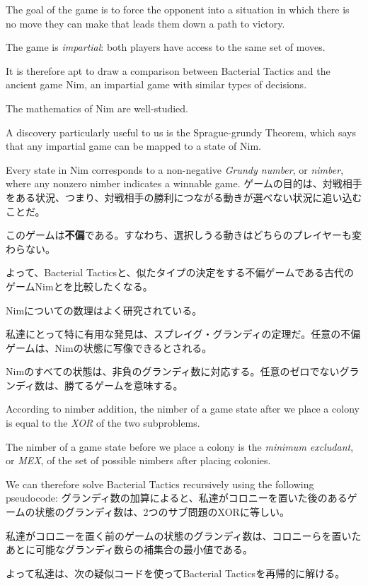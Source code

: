 \documentclass[uplatex,dvipdfmx]{jsarticle} \usepackage{amsmath,amssymb,bm}
\begin{document}
\begin{paracol}{2}
The goal of the game is to force the opponent into a situation in which there is no move they can make that leads them down a path to victory.

The game is {\it impartial}: both players have access to the same set of moves.

It is therefore apt to draw a comparison between Bacterial Tactics and the ancient game Nim, an impartial game with similar types of decisions.

The mathematics of Nim are well-studied.

A discovery particularly useful to us is the Sprague-grundy Theorem, which says that any impartial game can be mapped to a state of Nim.

Every state in Nim corresponds to a non-negative {\it Grundy number}, or {\it nimber}, where any nonzero nimber indicates a winnable game.
\switchcolumn
ゲームの目的は、対戦相手をある状況、つまり、対戦相手の勝利につながる動きが選べない状況に追い込むことだ。

このゲームは{\bf 不偏}である。すなわち、選択しうる動きはどちらのプレイヤーも変わらない。

よって、Bacterial Tacticsと、似たタイプの決定をする不偏ゲームである古代のゲームNimとを比較したくなる。

Nimについての数理はよく研究されている。

私達にとって特に有用な発見は、スプレイグ・グランディの定理だ。任意の不偏ゲームは、Nimの状態に写像できるとされる。

Nimのすべての状態は、非負のグランディ数に対応する。任意のゼロでないグランディ数は、勝てるゲームを意味する。
\end{paracol}
\vspace{\baselineskip}
\begin{paracol}{2}
According to nimber addition, the nimber of a game state after we place a colony is equal to the {\it XOR} of the two subproblems.

The nimber of a game state before we place a colony is the {\it minimum excludant}, or {\it MEX}, of the set of possible nimbers after placing colonies.

We can therefore solve Bacterial Tactics recursively using the following pseudocode:
\switchcolumn
グランディ数の加算によると、私達がコロニーを置いた後のあるゲームの状態のグランディ数は、2つのサブ問題のXORに等しい。

私達がコロニーを置く前のゲームの状態のグランディ数は、コロニーらを置いたあとに可能なグランディ数らの補集合の最小値である。

よって私達は、次の疑似コードを使ってBacterial Tacticsを再帰的に解ける。
\end{paracol}
\end{document}
